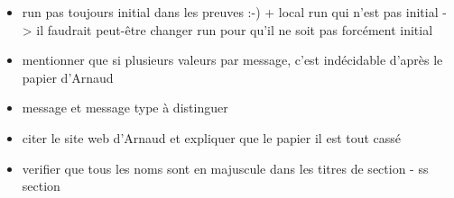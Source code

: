 \begin{itemize}
    \item run pas toujours initial dans les preuves :-) + local run qui n'est pas initial -> il faudrait peut-être changer run pour qu'il ne soit pas forcément initial
    \item mentionner que si plusieurs valeurs par message, c'est indécidable d'après le papier d'Arnaud
    \item message et message type à distinguer 
    \item citer le site web d'Arnaud et expliquer que le papier il est tout cassé
    \item verifier que tous les noms sont en majuscule dans les titres de section - ss section
\end{itemize}
